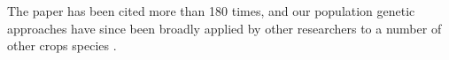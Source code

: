 \documentclass[11pt,letterpaper]{article}
\begin{document}
\noindent The paper has been cited more than 180 times, and our population genetic approaches have since been broadly applied by other researchers to a number of other crops species \citep[e.g.][]{qi2013genomic,jordan2015haplotype,zhou2015resequencing}.


%



\end{document}
